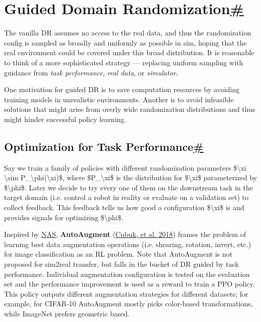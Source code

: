 \section{\texorpdfstring{Guided Domain Randomization\hyperref[guided-domain-randomization]{\#}}{Guided Domain Randomization\#}}\label{guided-domain-randomization}

The vanilla DR assumes no access to the real data, and thus the randomization config is sampled as broadly and uniformly as possible in sim, hoping that the real environment could be covered under this broad distribution. It is reasonable to think of a more sophisticated strategy --- replacing uniform sampling with guidance from \emph{task performance}, \emph{real data}, or \emph{simulator}.

One motivation for guided DR is to save computation resources by avoiding training models in unrealistic environments. Another is to avoid infeasible solutions that might arise from overly wide randomization distributions and thus might hinder successful policy learning.

\subsection{\texorpdfstring{Optimization for Task Performance\hyperref[optimization-for-task-performance]{\#}}{Optimization for Task Performance\#}}\label{optimization-for-task-performance}

Say we train a family of policies with different randomization parameters \$\textbackslash xi \textbackslash sim P\_\textbackslash phi(\textbackslash xi)\$, where \$P\_\textbackslash xi\$ is the distribution for \$\textbackslash xi\$ parameterized by \$\textbackslash phi\$. Later we decide to try every one of them on the downstream task in the target domain (i.e. control a robot in reality or evaluate on a validation set) to collect feedback. This feedback tells us how good a configuration \$\textbackslash xi\$ is and provides signals for optimizing \$\textbackslash phi\$.

\label{AutoAugment}{}Inspired by \href{https://ai.google/research/pubs/pub45826}{NAS}, \textbf{AutoAugment} (\href{https://arxiv.org/abs/1805.09501}{Cubuk, et al. 2018}) frames the problem of learning best data augmentation operations (i.e. shearing, rotation, invert, etc.) for image classification as an RL problem. Note that AutoAugment is not proposed for sim2real transfer, but falls in the bucket of DR guided by task performance. Individual augmentation configuration is tested on the evaluation set and the performance improvement is used as a reward to train a PPO policy. This policy outputs different augmentation strategies for different datasets; for example, for CIFAR-10 AutoAugment mostly picks color-based transformations, while ImageNet prefers geometric based.


